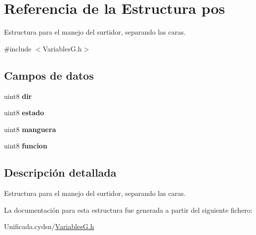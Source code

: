 \hypertarget{structpos}{}\section{Referencia de la Estructura pos}
\label{structpos}


Estructura para el manejo del surtidor, separando las caras.  




{\ttfamily \#include $<$Variables\+G.\+h$>$}

\subsection*{Campos de datos}
\begin{DoxyCompactItemize}
\item 
\mbox{\label{structpos_aa70f99e9128c4ddd0b68dd69062853ef}} 
uint8 {\bfseries dir}
\item 
\mbox{\label{structpos_a99c4f14b39922c9c7845cf664808fa4c}} 
uint8 {\bfseries estado}
\item 
\mbox{\label{structpos_a44063ee06b57fe21bcd41b22f2500ce4}} 
uint8 {\bfseries manguera}
\item 
\mbox{\label{structpos_a9ee05b7bc3aaac3d11674988f0784a68}} 
uint8 {\bfseries funcion}
\end{DoxyCompactItemize}


\subsection{Descripción detallada}
Estructura para el manejo del surtidor, separando las caras. 

La documentación para esta estructura fue generada a partir del siguiente fichero\+:\begin{DoxyCompactItemize}
\item 
Unificada.\+cydsn/\mbox{\hyperlink{_variables_g_8h}{Variables\+G.\+h}}\end{DoxyCompactItemize}
